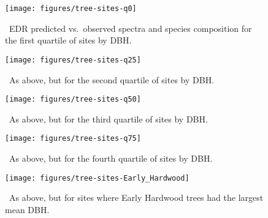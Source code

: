 

\begin{figure}[ht]
  \centering
  \texttt{[image: figures/tree-sites-q0]}
  \caption{\label{fig:tree-sites-q0}\
    EDR predicted vs.\ observed spectra and species composition for the first quartile of sites by DBH.
  }
\end{figure}

\clearpage

\begin{figure}[ht]
  \centering
  \texttt{[image: figures/tree-sites-q25]}
  \caption{\label{fig:tree-sites-q25}\
    As above, but for the second quartile of sites by DBH.
  }
\end{figure}

\clearpage

\begin{figure}[ht]
  \centering
  \texttt{[image: figures/tree-sites-q50]}
  \caption{\label{fig:tree-sites-q50}\
    As above, but for the third quartile of sites by DBH.
  }
\end{figure}

\clearpage

\begin{figure}[ht]
  \centering
  \texttt{[image: figures/tree-sites-q75]}
  \caption{\label{fig:tree-sites-q75}\
    As above, but for the fourth quartile of sites by DBH.
  }
\end{figure}

\clearpage

\begin{figure}[ht]
  \centering
  \texttt{[image: figures/tree-sites-Early\_Hardwood]}
  \caption{\label{fig:tree-sites-EH}\
    As above, but for sites where Early Hardwood trees had the largest mean DBH.
  }
\end{figure}

